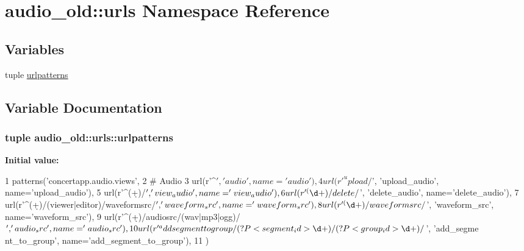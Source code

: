 \hypertarget{namespaceaudio__old_1_1urls}{
\section{audio\_\-old::urls Namespace Reference}
\label{namespaceaudio__old_1_1urls}
}
\subsection*{Variables}
\begin{DoxyCompactItemize}
\item 
tuple \hyperlink{namespaceaudio__old_1_1urls_ac23218f10e9d84eb76ada88548ddfc91}{urlpatterns}
\end{DoxyCompactItemize}


\subsection{Variable Documentation}
\hypertarget{namespaceaudio__old_1_1urls_ac23218f10e9d84eb76ada88548ddfc91}{
\subsubsection[{urlpatterns}]{\setlength{\rightskip}{0pt plus 5cm}tuple {\bf audio\_\-old::urls::urlpatterns}}}
\label{namespaceaudio__old_1_1urls_ac23218f10e9d84eb76ada88548ddfc91}
{\bfseries Initial value:}
\begin{DoxyCode}
1 patterns('concertapp.audio.views',
2     # Audio
3     url(r'^$', 'audio', name='audio'),
4     url(r'^upload/$', 'upload_audio', name='upload_audio'),
5     url(r'^(\d+)/$', 'view_audio', name='view_audio'),
6     url(r'^(\d+)/delete/$', 'delete_audio', name='delete_audio'),
7     url(r'^(\d+)/(viewer|editor)/waveformsrc/$', 'waveform_src', name='waveform_s
      rc'), 
8     url(r'^(\d+)/waveformsrc/$', 'waveform_src', name='waveform_src'), 
9     url(r'^(\d+)/audiosrc/(wav|mp3|ogg)/$', 'audio_src', name='audio_src'),
10     url(r'^addsegmenttogroup/(?P<segment_id>\d+)/(?P<group_id>\d+)/$', 'add_segme
      nt_to_group', name='add_segment_to_group'),
11 )
\end{DoxyCode}
